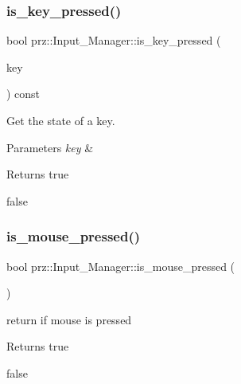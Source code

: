 \subsubsection{\texorpdfstring{is\_key\_pressed()}{is\_key\_pressed()}}
{\footnotesize\ttfamily bool prz\+::\+Input\+\_\+\+Manager\+::is\+\_\+key\+\_\+pressed (\begin{DoxyParamCaption}\item[{const P\+Key \&}]{key }\end{DoxyParamCaption}) const\hspace{0.3cm}{\ttfamily [inline]}}



Get the state of a key. 


\begin{DoxyParams}{Parameters}
{\em key} & \\
\hline
\end{DoxyParams}
\begin{DoxyReturn}{Returns}
true 

false 
\end{DoxyReturn}
\mbox{\label{classprz_1_1_input___manager_a038b61e13bb66fc5eaa2cfe613070057}} 
\subsubsection{\texorpdfstring{is\_mouse\_pressed()}{is\_mouse\_pressed()}}
{\footnotesize\ttfamily bool prz\+::\+Input\+\_\+\+Manager\+::is\+\_\+mouse\+\_\+pressed (\begin{DoxyParamCaption}{ }\end{DoxyParamCaption})\hspace{0.3cm}{\ttfamily [inline]}}



return if mouse is pressed 

\begin{DoxyReturn}{Returns}
true 

false 
\end{DoxyReturn}
\mbox{\label{classprz_1_1_input___manager_a77ba062e39f58eebe9c24ce4dab8fc58}} 

